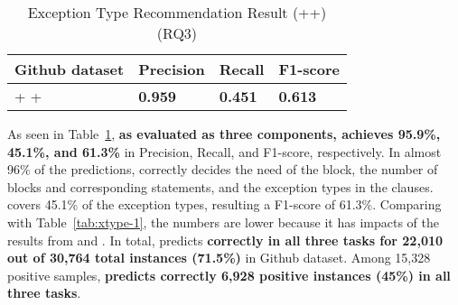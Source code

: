 \begin{table}[t]%
  \caption{Exception Type Recommendation Result (\xblock+\xstate+\xtype) (RQ3)}
  \vspace{-12pt}
  \small
	\begin{center}
		\renewcommand{\arraystretch}{1}
		\begin{tabular}{| p{3.10cm}<{\centering} | p{1.2cm}<{\centering} | p{1.2cm}<{\centering}| p{1.2cm}<{\centering}|}
		  \hline
			Github dataset  & Precision  & Recall & F1-score \\
			\hline
			\xblock + \xstate  + \xtype  & {\bf 0.959}  &  {\bf 0.451} & {\bf 0.613}\\
			\hline
		\end{tabular}
		\label{tab:xtype-4}
	\end{center}
\end{table}

As seen in Table~\ref{tab:xtype-4}, {\bf {\tool} as evaluated as three
  components, achieves 95.9\%, 45.1\%, and 61.3\%} in Precision,
Recall, and F1-score, respectively. In almost 96\% of the predictions,
{\tool} correctly decides the need of the  block, the
number of blocks and corresponding statements, and the exception types
in the  clauses. {\tool} covers 45.1\% of the exception
types, resulting a F1-score of 61.3\%. Comparing with
Table~\ref{tab:xtype-1}, the numbers are lower because it has impacts
of the results from \xblock and \xstate. In total, {\tool} predicts
{\bf correctly in all three tasks for 22,010 out of 30,764 total
  instances (71.5\%)} in Github dataset. Among 15,328 positive
samples, {\bf {\tool} predicts correctly 6,928 positive instances
  (45\%) in all three tasks}.

